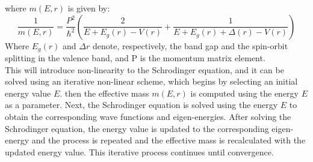 \documentclass[twoside,11pt]{article}
\begin{document}
    where $m(E, r)$ is given by:
    \begin{equation}
        \frac{1}{m(E, r)} = \frac{P^2}{\hbar^2} \left( \frac{2}{E + E_g(r) - V(r)} + \frac{1}{E + E_g(r) + \Delta(r) - V(r)} \right)
        \label{effictive mass}
    \end{equation}
    Where $E_g(r)$ and $\Delta r$ denote, respectively, the band gap and the spin-orbit splitting in the valence band, and P is the momentum matrix element.\\
    This will introduce non-linearity to the Schrodinger equation, and it can be solved using an iterative non-linear scheme, which begins by selecting an initial energy value $E$. then the effective mass \( m(E, r) \) is computed using the energy $E$ as a parameter. Next, the Schrodinger equation is solved using the energy $E$ to obtain the corresponding wave functions and eigen-energies. After solving the Schrodinger equation, the energy value is updated to the corresponding eigen-energy and the process is repeated and the effective mass is recalculated with the updated energy value. This iterative process continues until convergence.
    
    
\end{document}
